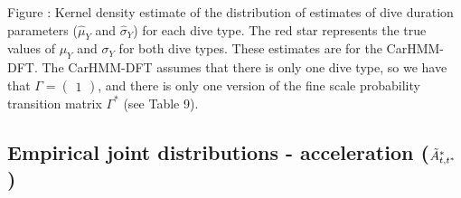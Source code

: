 \documentclass{article}
\begin{document}
        \noindent Figure : Kernel density estimate of the distribution of estimates of dive duration parameters ($\hat \mu_Y$ and $\hat \sigma_Y$) for each dive type. The red star represents the true values of $\mu_Y$ and $\sigma_Y$ for both dive types. These estimates are for the CarHMM-DFT. The CarHMM-DFT assumes that there is only one dive type, so we have that $\Gamma = \begin{pmatrix} 1 \end{pmatrix}$, and there is only one version of the fine scale probability transition matrix $\Gamma^*$ (see Table 9).
    
    \newpage
    \subsection{Empirical joint distributions - acceleration ($\tilde{A}^*_{t,t^*}$)}
\end{document}
